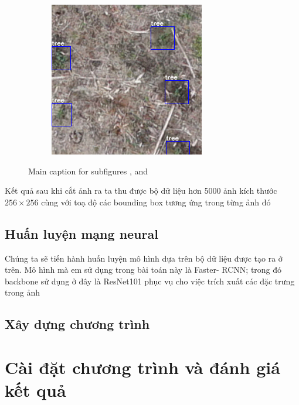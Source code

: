 \documentclass[a4paper, 12pt]{report}
\begin{document}
\begin{enumerate}[label= \textit{\alph*)}]
\begin{figure}[!h]
    \begin{subfigure}[!h]{0.45\textwidth}
    	\includegraphics[width=\linewidth]{Images/split3}
        \label{fig:subfig3}
    \end{subfigure}
    \caption[Optional caption for list of figures]{Main caption for subfigures ,  and }
\end{figure}
\end{enumerate}
Kết quả sau khi cắt ảnh ra ta thu được bộ dữ liệu hơn 5000 ảnh kích thước $256 \times 256$ cùng với toạ độ các bounding box tương ứng trong từng ảnh đó
\section{Huấn luyện mạng neural}
Chúng ta sẽ tiến hành huấn luyện mô hình dựa trên bộ dữ liệu được tạo ra ở trên.  Mô hình mà em sử dụng trong bài toán này là Faster- RCNN; trong đó backbone sử dụng ở đây là ResNet101 phục vụ cho việc trích xuất các đặc trưng trong ảnh
\section{Xây dựng chương trình}

\chapter{Cài đặt chương trình và đánh giá kết quả}
\end{document}
